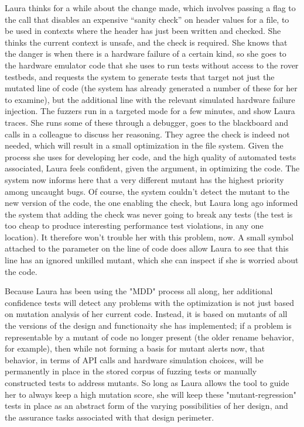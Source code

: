 Laura thinks for a while about the change made, which involves passing a flag to the call that disables an expensive ``sanity check'' on header values for a file, to be used in contexts where the header has just been written and checked.  She thinks the current context is unsafe, and the check is required.  She knows that the danger is when there is a hardware failure of a certain kind, so she goes to the hardware emulator code that she uses to run tests without access to the rover testbeds, and requests the system to generate tests that target not just the mutated line of code (the system has already generated a number of these for her to examine), but the additional line with the relevant simulated hardware failure injection.  The fuzzers run in a targeted mode for a few minutes, and show Laura traces.  She runs some of these through a debugger, goes to the blackboard and calls in a colleague to discuss her reasoning.  They agree the check is indeed not needed, which will result in a small optimization in the file system.  Given the process she uses for developing her code, and the high quality of automated tests associated, Laura feels confident, given the argument, in optimizing the code.  The system now informs here that a very different mutant has the highest priority among uncaught bugs.  Of course, the system couldn't detect the mutant to the new version of the code, the one enabling the check, but Laura long ago informed the system that adding the check was never going to break any tests (the test is too cheap to produce interesting performance test violations, in any one location).  It therefore won't trouble her with this problem, now.  A small symbol attached to the parameter on the line of code does allow Laura to see that this line has an ignored unkilled mutant, which she can inspect if she is worried about the code.

Because Laura has been using the "MDD" process all along, her additional confidence tests will detect any problems with the optimization is not just based on mutation analysis of her current code.  Instead, it is based on mutants of all the versions of the design and functionaity she has implemented; if a problem is representable by a mutant of code no longer present (the older rename behavior, for example), then while not forming a basis for mutant alerts now, that behavior, in terms of API calls and hardware simulation choices, will be permanently in place in the stored corpus of fuzzing tests or manually constructed tests to address mutants.  So long as Laura allows the tool to guide her to always keep a high mutation score, she will keep these "mutant-regression" tests in place as an abstract form of the varying possibilities of her design, and the assurance tasks associated with that design perimeter.